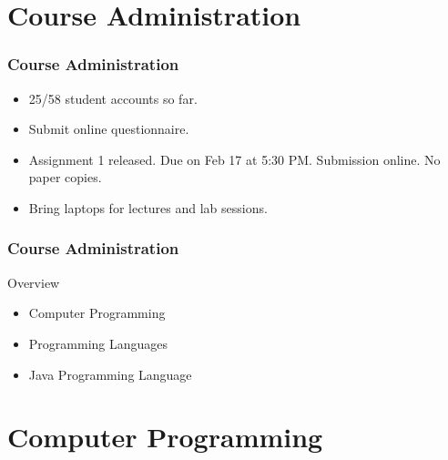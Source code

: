 \documentclass[10pt, compress]{beamer}
\begin{document}
\prepareCover

\section{Course Administration}

\begin{frame}[fragile]
	\frametitle{Course Administration}
	\begin{itemize}
		\item[] 25/58 student accounts so far.
		\item[] Submit online questionnaire.
		\item[] Assignment 1 released. Due on Feb 17 at 5:30 PM. Submission online. No paper copies.
		\item[] Bring laptops for lectures and lab sessions.
	\end{itemize}
\end{frame}

\begin{frame}[fragile]
	\frametitle{Course Administration}
	\begin{block}{Overview}
		\begin{itemize}
			\item[] Computer Programming
			\item[] Programming Languages
			\item[] Java Programming Language
		\end{itemize}
	\end{block}
\end{frame}

\section{Computer Programming}
\end{document}
